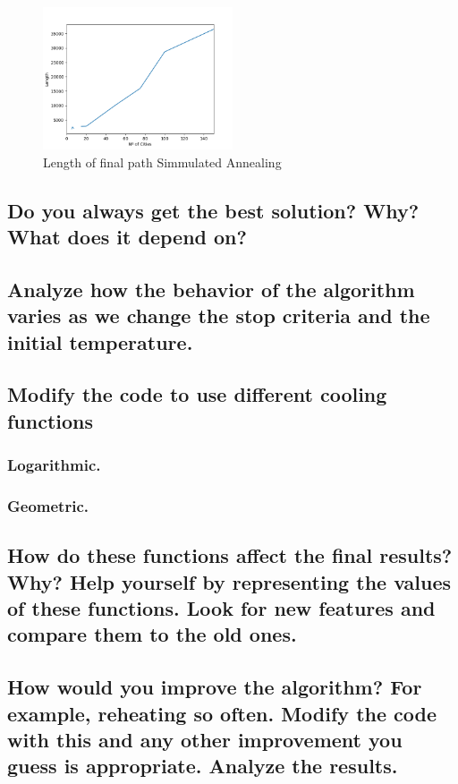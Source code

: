 \documentclass{article}
\begin{document}
        \begin{figure}[H]

            \centering
            \includegraphics[width=0.5\textwidth]{../media/02.SimAnnealing-length.png}
            \caption{Length of final path Simmulated Annealing}
            \label{Length of final path Simmulated Annealing}

        \end{figure}


        \subsection{Do you always get the best solution? Why? What does it depend on?}
    
        \subsection{Analyze how the behavior of the algorithm varies as we change the stop criteria
    and the initial temperature.}
    
        \subsection{Modify the code to use different cooling functions}
    
            \subsubsection{Logarithmic.}
    
            \subsubsection{Geometric.}
    
        \subsection{How do these functions affect the final results? Why? Help yourself by representing the values of these functions. Look for new features and compare them to the old ones.}
    
        \subsection{How would you improve the algorithm? For example, reheating so often. Modify
    the code with this and any other improvement you guess is appropriate. Analyze
    the results.}

 
\end{document}
